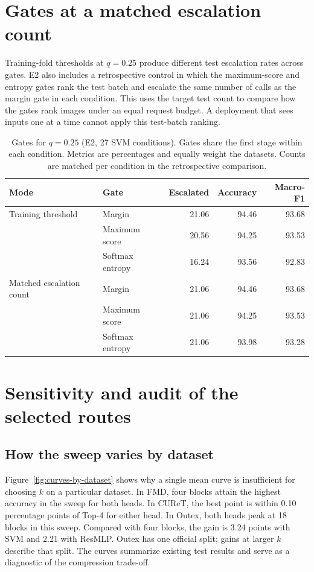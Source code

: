 \documentclass[10pt,a4paper,fleqn]{article}
\begin{document}
\section{Gates at a matched escalation count}

Training-fold thresholds at $q=0.25$ produce different test escalation rates across gates. E2 also includes a retrospective control in which the maximum-score and entropy gates rank the test batch and escalate the same number of calls as the margin gate in each condition. This uses the target test count to compare how the gates rank images under an equal request budget. A deployment that sees inputs one at a time cannot apply this test-batch ranking.

\begin{table}[htbp]
\centering
\caption{Gates for $q=0.25$ (E2, 27 SVM conditions). Gates share the first stage within each condition. Metrics are percentages and equally weight the datasets. Counts are matched per condition in the retrospective comparison.}
\label{tab:e2-compuertas}
\begin{tabular}{@{}llrrr@{}}
\toprule
Mode & Gate & Escalated & Accuracy & Macro-F1 \\
\midrule
Training threshold & Margin & 21.06 & 94.46 & 93.68 \\
 & Maximum score & 20.56 & 94.25 & 93.53 \\
 & Softmax entropy & 16.24 & 93.56 & 92.83 \\
\addlinespace
Matched escalation count & Margin & 21.06 & 94.46 & 93.68 \\
 & Maximum score & 21.06 & 94.25 & 93.53 \\
 & Softmax entropy & 21.06 & 93.98 & 93.28 \\
\bottomrule
\end{tabular}
\end{table}
\FloatBarrier

\section{Sensitivity and audit of the selected routes}

\subsection{How the sweep varies by dataset}

Figure~\ref{fig:curves-by-dataset} shows why a single mean curve is insufficient for choosing $k$ on a particular dataset. In FMD, four blocks attain the highest accuracy in the sweep for both heads. In CUReT, the best point is within 0.10 percentage points of Top-4 for either head. In Outex, both heads peak at 18 blocks in this sweep. Compared with four blocks, the gain is 3.24 points with SVM and 2.21 with ResMLP. Outex has one official split; gains at larger $k$ describe that split. The curves summarize existing test results and serve as a diagnostic of the compression trade-off.
\end{document}
